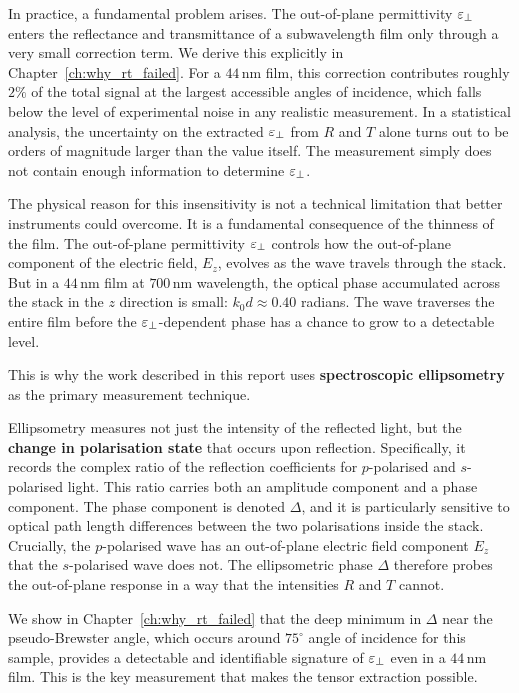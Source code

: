 In practice, a fundamental problem arises. The out-of-plane permittivity
$\varepsilon_{\perp}$ enters the reflectance and transmittance of a subwavelength film only
through a very small correction term. We derive this explicitly in
Chapter~\ref{ch:why_rt_failed}. For a $44$\,nm film, this correction
contributes roughly $2\%$ of the total signal at the largest accessible angles
of incidence, which falls below the level of experimental noise in any
realistic measurement. In a statistical analysis, the uncertainty on the
extracted $\varepsilon_{\perp}$ from $R$ and $T$ alone turns out to be orders of magnitude
larger than the value itself. The measurement simply does not contain enough
information to determine $\varepsilon_{\perp}$.

The physical reason for this insensitivity is not a technical limitation that
better instruments could overcome. It is a fundamental consequence of the
thinness of the film. The out-of-plane permittivity $\varepsilon_{\perp}$ controls how the
out-of-plane component of the electric field, $E_z$, evolves as the wave
travels through the stack. But in a $44$\,nm film at $700$\,nm wavelength, the
optical phase accumulated across the stack in the $z$ direction is small:
$k_0 d \approx 0.40$ radians. The wave traverses the entire film before the
$\varepsilon_{\perp}$-dependent phase has a chance to grow to a detectable level.

This is why the work described in this report uses \textbf{spectroscopic
ellipsometry} as the primary measurement technique.

Ellipsometry measures not just the intensity of the reflected light, but the
\textbf{change in polarisation state} that occurs upon reflection. Specifically,
it records the complex ratio of the reflection coefficients for $p$-polarised
and $s$-polarised light. This ratio carries both an amplitude component and a
phase component. The phase component is denoted $\Delta$, and it is
particularly sensitive to optical path length differences between the two
polarisations inside the stack. Crucially, the $p$-polarised wave has an
out-of-plane electric field component $E_z$ that the $s$-polarised wave does
not. The ellipsometric phase $\Delta$ therefore probes the out-of-plane
response in a way that the intensities $R$ and $T$ cannot.

We show in Chapter~\ref{ch:why_rt_failed} that the deep minimum in $\Delta$
near the pseudo-Brewster angle, which occurs around $75^\circ$ angle of
incidence for this sample, provides a detectable and identifiable signature of
$\varepsilon_{\perp}$ even in a $44$\,nm film. This is the key measurement that makes the
tensor extraction possible.

